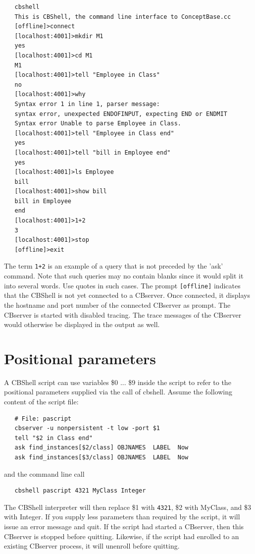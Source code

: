\begin{verbatim}
   cbshell
   This is CBShell, the command line interface to ConceptBase.cc
   [offline]>connect
   [localhost:4001]>mkdir M1
   yes
   [localhost:4001]>cd M1
   M1
   [localhost:4001]>tell "Employee in Class"
   no
   [localhost:4001]>why         
   Syntax error 1 in line 1, parser message:
   syntax error, unexpected ENDOFINPUT, expecting END or ENDMIT
   Syntax error Unable to parse Employee in Class.
   [localhost:4001]>tell "Employee in Class end"
   yes
   [localhost:4001]>tell "bill in Employee end"
   yes
   [localhost:4001]>ls Employee
   bill
   [localhost:4001]>show bill
   bill in Employee  
   end 
   [localhost:4001]>1+2
   3
   [localhost:4001]>stop
   [offline]>exit
\end{verbatim}


The term {\tt 1+2} is an example of a query that is not preceded by the 'ask' command. Note that such queries
may no contain blanks since it would split it into several words. Use quotes in such cases.
The prompt {\tt [offline]} indicates that the CBShell is not yet connected to a CBserver. Once connected,  
it displays the hostname and port number of the connected CBserver as prompt.
The CBserver is started with disabled tracing. The trace messages of the CBserver would otherwise 
be displayed in the output as well.


\section{Positional parameters}
\label{sec:cbshellvars}

A CBShell script can use variables \$0 ... \$9 inside the script to refer to 
the positional parameters supplied via the call of cbshell. Assume the following content
of the script file:

\begin{verbatim}
   # File: pascript
   cbserver -u nonpersistent -t low -port $1
   tell "$2 in Class end"
   ask find_instances[$2/class] OBJNAMES  LABEL  Now
   ask find_instances[$3/class] OBJNAMES  LABEL  Now
\end{verbatim}

and the command line call

\begin{verbatim}
   cbshell pascript 4321 MyClass Integer
\end{verbatim}


The CBShell interpreter will then replace \$1 with {\tt 4321}, \$2 with MyClass, and
\$3 with Integer.
If you supply less parameters than required by the script, it will issue an error message and quit.
If the script had started a CBserver, then this CBserver is stopped before quitting. 
Likewise, if the script had enrolled to an existing CBserver process, it will unenroll
before quitting.

